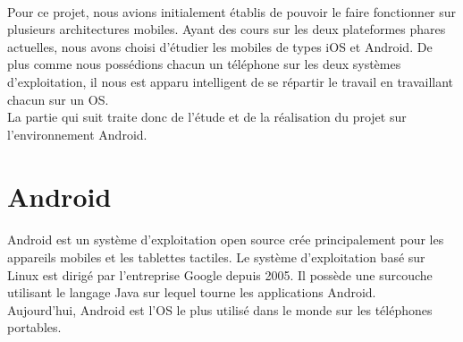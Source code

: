 \newpage


\paragraph{}
Pour ce projet, nous avions initialement établis de pouvoir le faire fonctionner sur plusieurs 
architectures mobiles. Ayant des cours sur les deux plateformes phares actuelles, nous avons choisi
d'étudier les mobiles de types iOS et Android. De plus comme nous possédions chacun un téléphone 
sur les deux systèmes d'exploitation, il nous est apparu intelligent de se répartir le travail en 
travaillant chacun sur un OS.
\\
La partie qui suit traite donc de l'étude et de la réalisation du projet sur l'environnement Android.



\section{Android}



\paragraph{}
Android est un système d'exploitation open source crée principalement pour les appareils mobiles et 
les tablettes tactiles. Le système d'exploitation basé sur Linux est dirigé par l'entreprise Google
depuis 2005. Il possède une surcouche utilisant le langage Java sur lequel tourne les applications 
Android.
\\
Aujourd'hui, Android est l'OS le plus utilisé dans le monde sur les téléphones portables.


